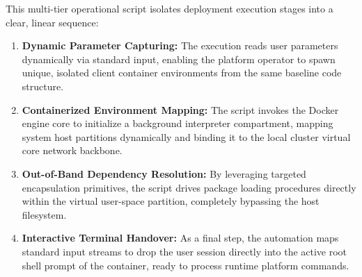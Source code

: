 This multi-tier operational script isolates deployment execution stages into a clear, linear sequence:
\begin{enumerate}
    \item \textbf{Dynamic Parameter Capturing:} The execution reads user parameters dynamically via standard input, enabling the platform operator to spawn unique, isolated client container environments from the same baseline code structure.
    \item \textbf{Containerized Environment Mapping:} The script invokes the Docker engine core to initialize a background interpreter compartment, mapping system host partitions dynamically and binding it to the local cluster virtual core network backbone.
    \item \textbf{Out-of-Band Dependency Resolution:} By leveraging targeted encapsulation primitives, the script drives package loading procedures directly within the virtual user-space partition, completely bypassing the host filesystem.
    \item \textbf{Interactive Terminal Handover:} As a final step, the automation maps standard input streams to drop the user session directly into the active root shell prompt of the container, ready to process runtime platform commands.
\end{enumerate}
